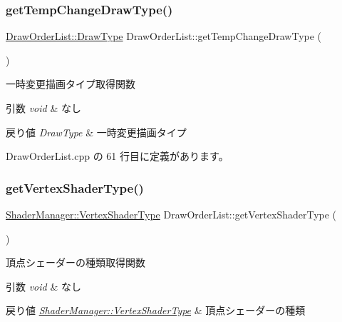 \subsubsection{\texorpdfstring{get\+Temp\+Change\+Draw\+Type()}{getTempChangeDrawType()}}
{\footnotesize\ttfamily \mbox{\hyperlink{class_draw_order_list_a6c9b9ceb312c16d399ef355f4f3486bb}{Draw\+Order\+List\+::\+Draw\+Type}} Draw\+Order\+List\+::get\+Temp\+Change\+Draw\+Type (\begin{DoxyParamCaption}{ }\end{DoxyParamCaption})}



一時変更描画タイプ取得関数 


\begin{DoxyParams}{引数}
{\em void} & なし \\
\hline
\end{DoxyParams}

\begin{DoxyRetVals}{戻り値}
{\em Draw\+Type} & 一時変更描画タイプ \\
\hline
\end{DoxyRetVals}


 Draw\+Order\+List.\+cpp の 61 行目に定義があります。

\mbox{\label{class_draw_order_list_acf4c6c92ca4105bf6101a7c99e134aa1}} 
\subsubsection{\texorpdfstring{get\+Vertex\+Shader\+Type()}{getVertexShaderType()}}
{\footnotesize\ttfamily \mbox{\hyperlink{class_shader_manager_a9b51e49d70eb3cc58f6d1f3994e8cfbd}{Shader\+Manager\+::\+Vertex\+Shader\+Type}} Draw\+Order\+List\+::get\+Vertex\+Shader\+Type (\begin{DoxyParamCaption}{ }\end{DoxyParamCaption})}



頂点シェーダーの種類取得関数 


\begin{DoxyParams}{引数}
{\em void} & なし \\
\hline
\end{DoxyParams}

\begin{DoxyRetVals}{戻り値}
{\em \mbox{\hyperlink{class_shader_manager_a9b51e49d70eb3cc58f6d1f3994e8cfbd}{Shader\+Manager\+::\+Vertex\+Shader\+Type}}} & 頂点シェーダーの種類 \\
\hline
\end{DoxyRetVals}



